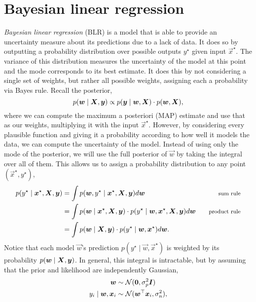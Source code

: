 \section{Bayesian linear regression} \label{sec:blr}

\textit{Bayesian linear regression} (BLR) is a model that is able to provide an
uncertainty measure about its predictions due to a lack of data. It does so by outputting a probability
distribution over possible outputs $y^\star$ given input $\vec{x}^\star$. The
variance of this distribution measures the uncertainty of the model at this
point and the mode corresponds to its best estimate. It does this by not
considering a single set of weights, but rather all possible weights, assigning
each a probability via Bayes rule. Recall the posterior, \[
  p(\bm{w}\mid \bm{X}, \bm{y}) \propto p(\bm{y}\mid \bm{w}, \bm{X})\cdot p(\bm{w}, \bm{X})
,\]
where we can compute the maximum a posteriori (MAP) estimate and use that as our
weights, multiplying it with the input $\vec{x}^\star$. However, by considering
every plausible function and giving it a probability according to how well it
models the data, we can compute the uncertainty of the model. Instead of using
only the mode of the posterior, we will use the full posterior of $\vec{w}$ by
taking the integral over all of them. This allows us to assign a probability
distribution to any point $(\vec{x}^\star, y^\star)$,
\begin{align*}
  p(y^\star\mid\vec{x}^\star,\mat{X},\vec{y}) &= \int p(\vec{w},y^\star\mid \vec{x}^\star,\mat{X},\vec{y})d\vec{w} & \text{\footnotesize sum rule} \\
  &= \int p(\vec{w}\mid \vec{x}^\star,\mat{X},\vec{y})\cdot p(y^\star\mid \vec{w},\vec{x}^\star,\mat{X},\vec{y})d\vec{w} & \text{\footnotesize product rule} \\
  &= \int p(\vec{w}\mid \mat{X},\vec{y})\cdot p(y^\star\mid \vec{w},\vec{x}^\star)d\vec{w}
.\end{align*}
Notice that each model $\vec{w}$'s prediction
$p(y^\star\mid\vec{w},\vec{x}^\star)$ is weighted by its probability
$p(\bm{w}\mid\bm{X},\bm{y})$. In general, this integral is
intractable, but by assuming that the prior and likelihood are independently
Gaussian,
\begin{align*}
  \bm{w} &\sim \mathcal{N}(\bm{0},\sigma_p^2\bm{I}) \\
  y_i\mid \bm{w},\bm{x}_i &\sim \mathcal{N}(\bm{w}^\top\bm{x}_i,\sigma_n^2)
,\end{align*}
